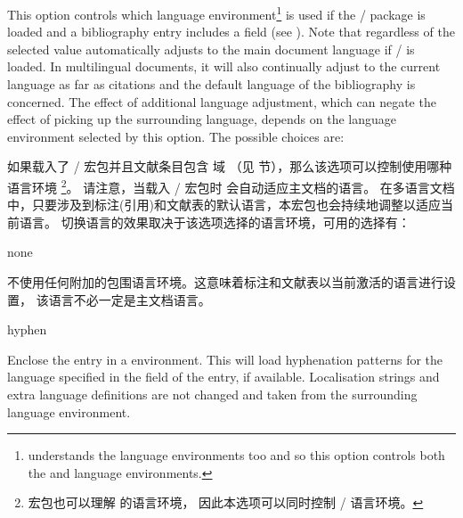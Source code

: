 \begin{optionlist}
This option controls which  language environment\footnote{ understands the  language environments too and so this option controls both the  and  language environments.} is used if the / package is loaded and a bibliography entry includes a  field (see ). Note that regardless of the selected value \biblatex automatically adjusts to the main document language if / is loaded. In multilingual documents, it will also continually adjust to the current language as far as citations and the default language of the bibliography is concerned. The effect of additional language adjustment, which can negate the effect of picking up the surrounding language, depends on the language environment selected by this option. The possible choices are:

如果载入了 / 宏包并且文献条目包含  域
（见  节），那么该选项可以控制使用哪种  语言环境
\footnote{	 宏包也可以理解  的语言环境，	因此本选项可以同时控制 / 语言环境。}。
请注意，当载入 / 宏包时 \biblatex 会自动适应主文档的语言。
在多语言文档中，只要涉及到标注(引用)和文献表的默认语言，本宏包也会持续地调整以适应当前语言。
切换语言的效果取决于该选项选择的语言环境，可用的选择有：

\begin{valuelist}

\item[none]


不使用任何附加的包围语言环境。这意味着标注和文献表以当前激活的语言进行设置，
该语言不必一定是主文档语言。


\item[hyphen]

Enclose the entry in a  environment. This will load hyphenation patterns for the language specified in the  field of the entry, if available. Localisation strings and extra language definitions are not changed and taken from the surrounding language environment.


\end{valuelist}
\end{optionlist}
